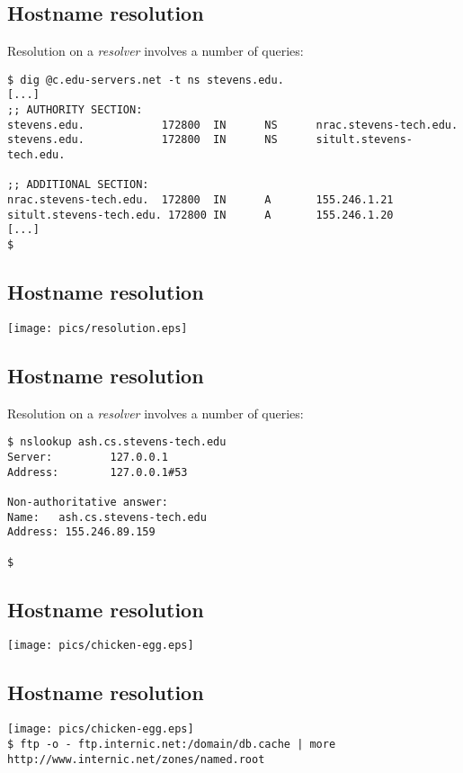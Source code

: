 \documentclass[xga]{xdvislides}
\begin{document}
\subsection{Hostname resolution}
Resolution on a {\em resolver} involves a number of queries:
\begin{verbatim}
$ dig @c.edu-servers.net -t ns stevens.edu.
[...]
;; AUTHORITY SECTION:
stevens.edu.            172800  IN      NS      nrac.stevens-tech.edu.
stevens.edu.            172800  IN      NS      sitult.stevens-tech.edu.

;; ADDITIONAL SECTION:
nrac.stevens-tech.edu.  172800  IN      A       155.246.1.21
sitult.stevens-tech.edu. 172800 IN      A       155.246.1.20
[...]
$
\end{verbatim}

\subsection{Hostname resolution}
\vspace*{\fill}
\begin{center}
	\texttt{[image: pics/resolution.eps]}
\end{center}
\vspace*{\fill}


\subsection{Hostname resolution}
Resolution on a {\em resolver} involves a number of queries:
\begin{verbatim}
$ nslookup ash.cs.stevens-tech.edu
Server:         127.0.0.1
Address:        127.0.0.1#53

Non-authoritative answer:
Name:   ash.cs.stevens-tech.edu
Address: 155.246.89.159

$
\end{verbatim}

\subsection{Hostname resolution}
\vspace*{\fill}
\begin{center}
	\texttt{[image: pics/chicken-egg.eps]} \\
	\vspace*{\fill}
\end{center}

\subsection{Hostname resolution}
\vspace*{\fill}
\begin{center}
	\texttt{[image: pics/chicken-egg.eps]} \\
	\addvspace{.2in}
	\verb+$ ftp -o - ftp.internic.net:/domain/db.cache | more+ \\
	\verb+http://www.internic.net/zones/named.root+
	\vspace*{\fill}
\end{center}
\end{document}
